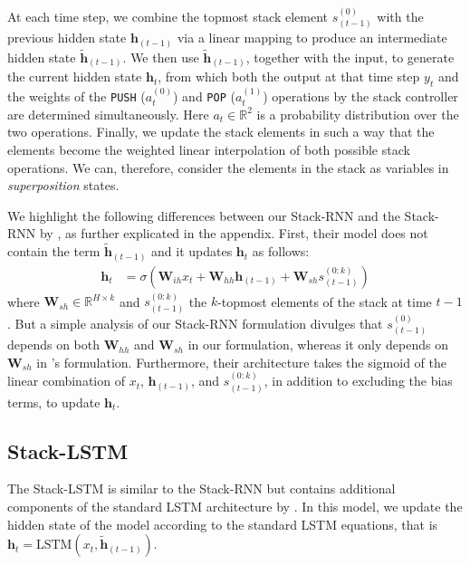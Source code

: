 \documentclass[11pt,a4paper]{article}
\theoremstyle{plain}
\newcommand{\weight}[1] {\mathbf{W}_{#1}}
\newcommand{\hidden}[1] {\mathbf{h}_{#1}}
\newcommand{\hiddenp}[1] {\mathbf{\tilde{h}}_{#1}}
\begin{document}
At each time step, we combine the topmost stack element $s_{(t-1)}^{(0)}$ with the previous hidden state $\hidden{(t-1)}$ via a linear mapping to produce an intermediate hidden state $\hiddenp{(t-1)}$. We then use $\hiddenp{(t-1)}$, together with the input,
to generate the current hidden state $\hidden{t}$, from which both the output at that time step $y_{t}$ and the weights of the \texttt{PUSH} ($a_{t}^{(0)}$) and \texttt{POP} ($a_{t}^{(1)}$) operations by the stack controller are determined simultaneously. Here $a_t \in \mathbb{R}^2$ is a probability distribution over the two operations. 
Finally, we update the stack elements in such a way that the elements become the weighted linear interpolation of both possible stack operations. We can, therefore, consider the elements in the stack as variables in \textit{superposition} states.

We highlight the following differences between our Stack-RNN and the Stack-RNN by \citet{joulin2015inferring}, as further explicated in the appendix. First, their model does not contain the term $\hiddenp{(t-1)}$ and it updates $\hidden{t}$ as follows:
\vspace{-0.2em}
\begin{align*}
    \hidden{t} &= \sigma(\weight{ih} x_t + \weight{hh} \hidden{(t-1)} + \weight{sh} s_{(t-1)}^{(0:k)})
\end{align*}
where $\weight{sh} \in \mathbb{R}^{H \times k}$ and $s_{(t-1)}^{(0:k)}$ the $k$-topmost elements of the stack at time $t-1$. But a simple analysis of our Stack-RNN formulation divulges that $s_{(t-1)}^{(0)}$ depends on both $\weight{hh}$ and $\weight{sh}$ in our formulation, whereas it only depends on $\weight{sh}$ in \citeauthor{joulin2015inferring}'s formulation. Furthermore, their architecture takes the sigmoid of the linear combination of $x_t$, $\hidden{(t-1)}$, and $s_{(t-1)}^{(0:k)}$, in addition to excluding the bias terms, to update $\hidden{t}$.

\subsection{Stack-LSTM}
The Stack-LSTM is similar to the Stack-RNN but contains additional components of the standard LSTM architecture by \citet{hochreiter1997long}. In this model, we update the hidden state of the model according to the standard LSTM equations, that is $\hidden{t} = \text{LSTM} (x_t, \hiddenp{(t-1)})$.
\end{document}
